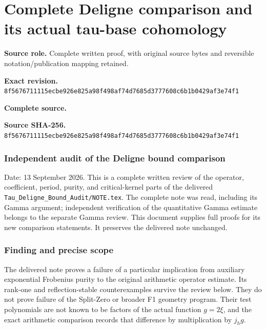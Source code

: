 \begingroup

\section{Complete Deligne comparison and its actual tau-base cohomology}


\begingroup
\sloppy
\small

\noindent\textbf{Source role.} Complete written proof, with original source bytes and reversible notation/publication mapping retained.\par
\noindent\textbf{Exact revision.} \nolinkurl{8f5676711115ecbe926e825a98f498af74d7685d3777608c6b1b0429af3e74f1}\par
\noindent\textbf{Complete source.} \par
\noindent\textbf{Source SHA-256.} \nolinkurl{8f5676711115ecbe926e825a98f498af74d7685d3777608c6b1b0429af3e74f1}\par\medskip
\subsubsection{Independent audit of the Deligne bound comparison}\label{endpoint-purity_review--independent-audit-of-the-deligne-bound-comparison}

Date: 13 September 2026. This is a complete written review of the operator, coefficient, period, purity, and critical-kernel parts of the delivered \nolinkurl{Tau_Deligne_Bound_Audit/NOTE.tex}. The complete note was read, including its Gamma argument; independent verification of the quantitative Gamma estimate belongs to the separate Gamma review. This document supplies full proofs for its new comparison statements. It preserves the delivered note unchanged.

\subsubsection{Finding and precise scope}\label{endpoint-purity_review--finding-and-precise-scope}

The delivered note proves a failure of a particular implication from auxiliary exponential Frobenius purity to the original arithmetic operator estimate. Its rank-one and reflection-stable counterexamples survive the review below. They do not prove failure of the Split-Zero or broader F1 geometry program. Their test polynomials are not known to be factors of the actual function \(g=2\xi\), and the exact arithmetic comparison records that difference by multiplication by \(j_hg\).

